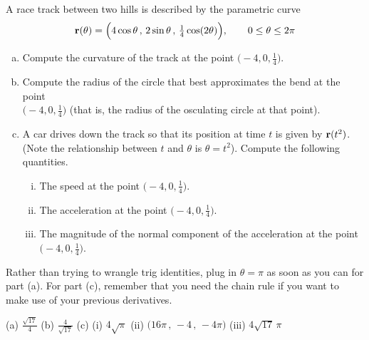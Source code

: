 \begin{question}[M317 2017A] %
	A race track between two hills is described by the parametric curve
	\begin{equation*}
	\mathbf{r}(\theta) = \Big(4 \cos\theta\,,\, 2\sin\theta\,,\, 
	\tfrac{1}{4}\cos(2\theta)\Big),\qquad
	0 \le \theta \le 2\pi
	\end{equation*}
	\begin{enumerate}[(a)]
		\item
		Compute the curvature of the track at the point $\big(-4, 0, \frac{1}{4}\big)$.
		
		\item
		Compute the radius of the circle that best approximates the bend at the
		point\\ $\big(-4, 0, \frac{1}{4}\big)$ (that is, the radius of the 
		osculating circle at that point).
		
		\item
		A car drives down the track so that its position at time $t$ is given by
		$\mathbf{r}(t^2)$. (Note the relationship between $t$ and $\theta$ is $\theta = t^2$). 
		Compute the following quantities.
		\begin{enumerate}[(i)]
			\item
			The speed at the point $\big(-4, 0, \frac{1}{4}\big)$.
			\item
			The acceleration at the point $\big(-4, 0, \frac{1}{4}\big)$.
			
			\item
			The magnitude of the normal component of the acceleration at the point\\
			$\big(-4, 0, \frac{1}{4}\big)$.
		\end{enumerate}
	\end{enumerate}
\end{question}

\begin{hint} 
	Rather than trying to wrangle trig identities, plug in $\theta=\pi$ as soon as you can for part (a). For part (c), remember that you need the chain rule if you want to make use of your previous derivatives.
\end{hint}

\begin{answer} 
	(a) $\frac{\sqrt{17}}{4}$\qquad
	(b) $\frac{4}{\sqrt{17}}$\qquad
	(c) (i) $4\sqrt{\pi} $\quad
	(ii) $\big( 16\pi\,,\, -4\,,\, -4\pi\big)$\quad
	(iii) $4\sqrt{17}\,\pi$
\end{answer}

